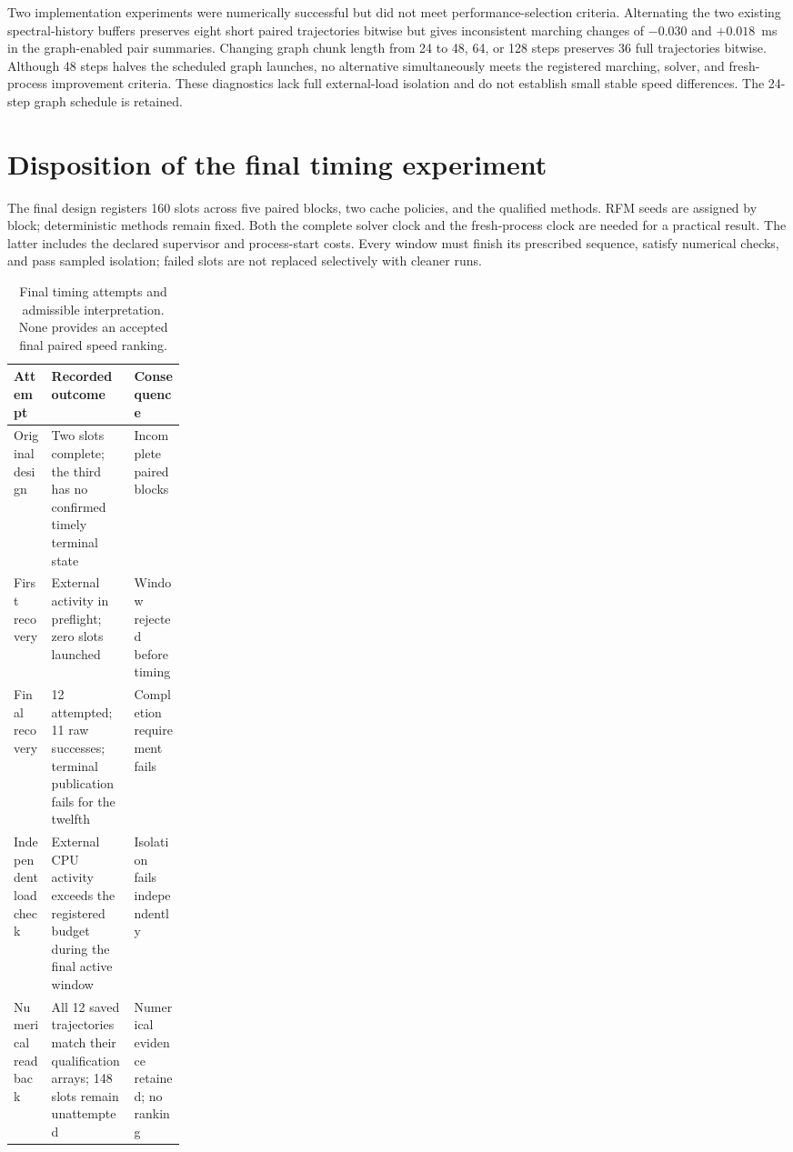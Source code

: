Two implementation experiments were numerically successful but did not meet performance-selection criteria. Alternating the two existing spectral-history buffers preserves eight short paired trajectories bitwise but gives inconsistent marching changes of $-0.030$ and $+0.018$~ms in the graph-enabled pair summaries. Changing graph chunk length from 24 to 48, 64, or 128 steps preserves 36 full trajectories bitwise. Although 48 steps halves the scheduled graph launches, no alternative simultaneously meets the registered marching, solver, and fresh-process improvement criteria. These diagnostics lack full external-load isolation and do not establish small stable speed differences. The 24-step graph schedule is retained.

\section{Disposition of the final timing experiment}
\label{sec:timing-disposition}

The final design registers 160 slots across five paired blocks, two cache policies, and the qualified methods. RFM seeds are assigned by block; deterministic methods remain fixed. Both the complete solver clock and the fresh-process clock are needed for a practical result. The latter includes the declared supervisor and process-start costs. Every window must finish its prescribed sequence, satisfy numerical checks, and pass sampled isolation; failed slots are not replaced selectively with cleaner runs.

\begin{table}[tbp]
\centering\small
\caption{Final timing attempts and admissible interpretation. None provides an accepted final paired speed ranking.}
\label{tab:timing-status}
\begin{tabularx}{\linewidth}{@{}p{0.22\linewidth}XX@{}}
\toprule
Attempt & Recorded outcome & Consequence \\
\midrule
Original design & Two slots complete; the third has no confirmed timely terminal state & Incomplete paired blocks \\
First recovery & External activity in preflight; zero slots launched & Window rejected before timing \\
Final recovery & 12 attempted; 11 raw successes; terminal publication fails for the twelfth & Completion requirement fails \\
Independent load check & External CPU activity exceeds the registered budget during the final active window & Isolation fails independently \\
Numerical readback & All 12 saved trajectories match their qualification arrays; 148 slots remain unattempted & Numerical evidence retained; no ranking \\
\bottomrule
\end{tabularx}
\end{table}

